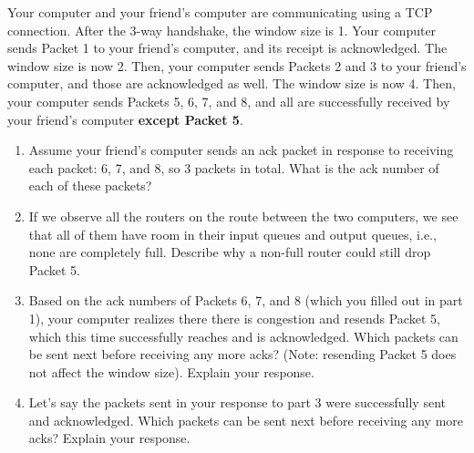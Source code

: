 \documentclass[10pt]{article}
\newenvironment{problem}[2][]{\begin{trivlist}
\item[\hskip \labelsep {\bfseries #1}\hskip \labelsep {\bfseries #2.}]}{\end{trivlist}}
\begin{document}
\newpage
\begin{problem}{5: TCP Congestion Control}
Your computer and your friend's computer are communicating using a TCP connection. After the 3-way handshake, the window size is 1. Your computer sends Packet 1 to your friend's computer, and its receipt is acknowledged. The window size is now 2. Then, your computer sends Packets 2 and 3 to your friend's computer, and those are acknowledged as well. The window size is now 4. Then, your computer sends Packets 5, 6, 7, and 8, and all are successfully received by your friend's computer \textbf{except Packet 5}.
\begin{enumerate}
    \item Assume your friend's computer sends an ack packet in response to receiving each packet: 6, 7, and 8, so 3 packets in total. What is the ack number of each of these packets?
    \item If we observe all the routers on the route between the two computers, we see that all of them have room in their input queues and output queues, i.e., none are completely full. Describe why a non-full router could still drop Packet 5.
    \item Based on the ack numbers of Packets 6, 7, and 8 (which you filled out in part 1), your computer realizes there there is congestion and resends Packet 5, which this time successfully reaches and is acknowledged. Which packets can be sent next before receiving any more acks? (Note: resending Packet 5 does not affect the window size). Explain your response.
    \item Let's say the packets sent in your response to part 3 were successfully sent and acknowledged. Which packets can be sent next before receiving any more acks? Explain your response.
\end{enumerate}
\end{problem}
\end{document}
